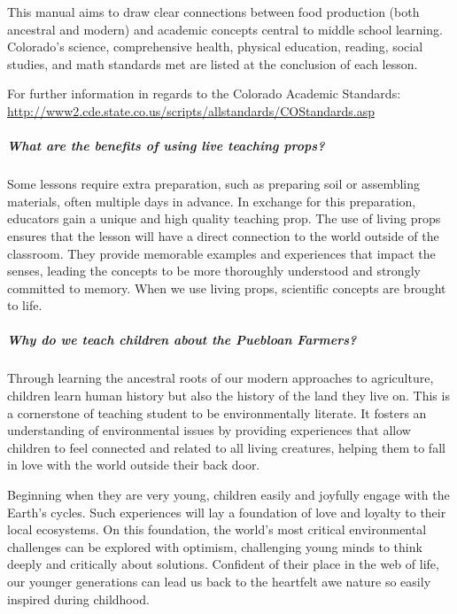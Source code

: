 \documentclass[12pt,]{article}
\let\oldsubparagraph\subparagraph
\renewcommand{\subparagraph}[1]{\oldsubparagraph{#1}\mbox{}}
\begin{document}
This manual aims to draw clear connections between food production (both ancestral and modern) and academic concepts central to middle school learning. Colorado's science, comprehensive health, physical education, reading, social studies, and math standards met are listed at the conclusion of each lesson.

For further information in regards to the Colorado Academic Standards: \url{http://www2.cde.state.co.us/scripts/allstandards/COStandards.asp}

\hypertarget{what-are-the-benefits-of-using-live-teaching-props}{%
\subparagraph{What are the benefits of using live teaching props?}\label{what-are-the-benefits-of-using-live-teaching-props}}

Some lessons require extra preparation, such as preparing soil or assembling materials, often multiple days in advance. In exchange for this preparation, educators gain a unique and high quality teaching prop. The use of living props ensures that the lesson will have a direct connection to the world outside of the classroom. They provide memorable examples and experiences that impact the senses, leading the concepts to be more thoroughly understood and strongly committed to memory. When we use living props, scientific concepts are brought to life.

\hypertarget{why-do-we-teach-children-about-the-puebloan-farmers}{%
\subparagraph{Why do we teach children about the Puebloan Farmers?}\label{why-do-we-teach-children-about-the-puebloan-farmers}}

Through learning the ancestral roots of our modern approaches to agriculture, children learn human history but also the history of the land they live on. This is a cornerstone of teaching student to be environmentally literate. It fosters an understanding of environmental issues by providing experiences that allow children to feel connected and related to all living creatures, helping them to fall in love with the world outside their back door.

Beginning when they are very young, children easily and joyfully engage with the Earth's cycles. Such experiences will lay a foundation of love and loyalty to their local ecosystems. On this foundation, the world's most critical environmental challenges can be explored with optimism, challenging young minds to think deeply and critically about solutions. Confident of their place in the web of life, our younger generations can lead us back to the heartfelt awe nature so easily inspired during childhood.
\end{document}
